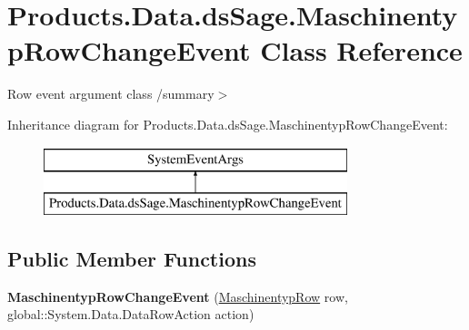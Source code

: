 \hypertarget{class_products_1_1_data_1_1ds_sage_1_1_maschinentyp_row_change_event}{}\section{Products.\+Data.\+ds\+Sage.\+Maschinentyp\+Row\+Change\+Event Class Reference}
\label{class_products_1_1_data_1_1ds_sage_1_1_maschinentyp_row_change_event}


Row event argument class /summary$>$  


Inheritance diagram for Products.\+Data.\+ds\+Sage.\+Maschinentyp\+Row\+Change\+Event\+:\begin{figure}[H]
\begin{center}
\leavevmode
\includegraphics[height=2.000000cm]{class_products_1_1_data_1_1ds_sage_1_1_maschinentyp_row_change_event}
\end{center}
\end{figure}
\subsection*{Public Member Functions}
\begin{DoxyCompactItemize}
\item 
{\bfseries Maschinentyp\+Row\+Change\+Event} (\hyperlink{class_products_1_1_data_1_1ds_sage_1_1_maschinentyp_row}{Maschinentyp\+Row} row, global\+::\+System.\+Data.\+Data\+Row\+Action action)\hypertarget{class_products_1_1_data_1_1ds_sage_1_1_maschinentyp_row_change_event_a63b011dd4c8ee899280bb5360445c3eb}{}\label{class_products_1_1_data_1_1ds_sage_1_1_maschinentyp_row_change_event_a63b011dd4c8ee899280bb5360445c3eb}

\end{DoxyCompactItemize}

